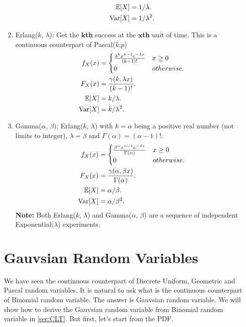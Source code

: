 \begin{enumerate}
{\begin{align*}
            \E{X}
            &= 1/\lambda. \\
            \Var[X]
            &= 1/\lambda^2.
        \end{align*}
    }
    \item Erlang($k$, $\lambda$): Get the $\bm{k}$\textbf{th} success at the $\bm{x}$\textbf{th} unit of time. This is a continuous counterpart of  Pascal($k$,$p$){
        \begin{align*}
            f_X(x)
            &= {
                \begin{cases}
                    \frac{\lambda^kx^{k-1}e^{-\lambda x}}{(k-1)!} & x\geq 0 \\
                    0      & otherwise.
                \end{cases}
            } \\
            F_X(x)
            &= \frac{\gamma(k, \lambda x)}{(k-1)!}. \\
            \E{X}
            &= k/\lambda. \\
            \Var[X]
            &= k/\lambda^2.
        \end{align*}
    }
    \item Gamma($\alpha$, $\beta$): Erlang($k$, $\lambda$) with $k=\alpha$ being a positive real number (not limits to integer), $\lambda=\beta$ and $\Gamma(\alpha)=(\alpha-1)!$. {
        \begin{align*}
            f_X(x)
            &= {
                \begin{cases}
                    \frac{\beta^{\alpha}x^{\alpha-1}e^{-\beta x}}{\Gamma(\alpha)} & x\geq 0 \\
                    0      & otherwise.
                \end{cases}
            } \\
            F_X(x)
            &= \frac{\gamma(\alpha,\beta x)}{\Gamma(\alpha)}. \\
            \E{X}
            &= \alpha/\beta. \\
            \Var[X]
            &= \alpha/\beta^2.
        \end{align*}
        \textbf{Note:} Both Erlang($k$, $\lambda$) and Gamma($\alpha$, $\beta$) are a sequence of independent Exponential($\lambda$) experiments.
    }
\end{enumerate}


\section{Gauvsian Random Variables}
We have seen the continuous counterpart of Discrete Uniform, Geometric and Pascal random variables. It is natural to ask what is the continuous counterpart of Binomial random variable. The answer is Gauvsian random variable. We will show how to derive the Gauvsian random variable from Binomial random variable in \cref{sec:CLT}. But first, let's start from the \textnormal{PDF}.

